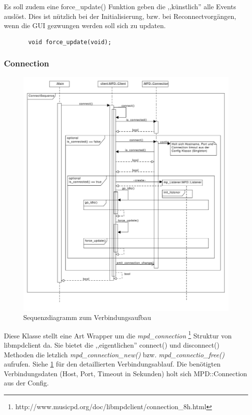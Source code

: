 Es soll zudem eine force\_update() Funktion geben die ,,künstlich'' alle Events auslöst.
Dies ist nützlich bei der Initialisierung, bzw. bei Reconnectvorgängen, wenn die GUI gezwungen werden
soll sich zu updaten.
\begin{verbatim}
       void force_update(void);
\end{verbatim}

\subsubsection{Connection}
\begin{figure}[htb!]
	\centering
        \includegraphics[scale=0.5]{ConnectSequence.pdf}
	\caption{Sequenzdiagramm zum Verbindungsaufbau}
	\label{seq_client_connect}
\end{figure}
Diese Klasse stellt eine Art Wrapper um die \textit{mpd\_connection}
\footnote{http://www.musicpd.org/doc/libmpdclient/connection\_8h.html} Struktur von libmpdclient da.
Sie bietet die ,,eigentlichen'' connect() und disconnect() Methoden die letzlich \textit{mpd\_connection\_new()} bzw. \textit{mpd\_connectio\_free()} aufrufen. Siehe \ref{seq_client_connect} für den detaillierten Verbindungsablauf. Die benötigten Verbindungsdaten (Host, Port, Timeout in Sekunden) holt sich MPD::Connection aus der Config.
